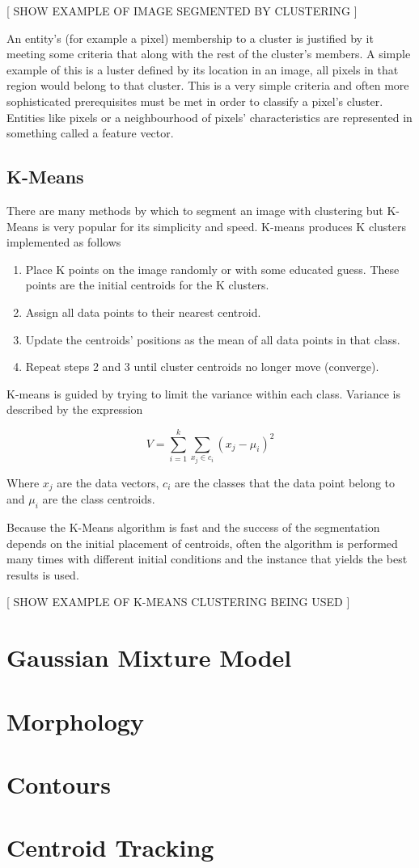 [ SHOW EXAMPLE OF IMAGE SEGMENTED BY CLUSTERING ]

An entity’s  (for example a pixel) membership to a cluster is justified by it meeting some criteria that along with the rest of the cluster’s members. A simple example of this is a luster defined by its location in an image, all pixels in that region would belong to that cluster. This is a very simple criteria and often more sophisticated prerequisites must be met in order to classify a pixel's cluster. Entities like pixels or a neighbourhood of pixels' characteristics are represented in something called a feature vector.


\subsection{K-Means}
There are many methods by which to segment an image with clustering but K-Means is very popular for its simplicity and speed. K-means produces K clusters implemented as follows

    \begin{enumerate}
    \itemsep0em
        \item Place K points on the image randomly or with some educated guess. These points are the initial centroids for the K clusters.  
        \item Assign all data points to their nearest centroid.
        \item Update the centroids' positions as the mean of all data points in that class.
        \item Repeat steps 2 and 3 until cluster centroids no longer move (converge). 
    \end{enumerate}

K-means is guided by trying to limit the variance within each class. Variance is described by the expression

\begin{equation}\label{eq:2}
   V = \sum_{i=1}^k\sum_{x_j\in c_i}(x_j-\mu_i)^2 
\end{equation}

Where {$x_j$} are the data vectors, $c_i$ are the classes that the data point belong to and $\mu_i$ are the class centroids.

Because the K-Means algorithm is fast and the success of the segmentation depends on the initial placement of centroids, often the algorithm is performed many times with different initial conditions and the instance that yields the best results is used. 


[ SHOW EXAMPLE OF K-MEANS CLUSTERING BEING USED ]
\section{Gaussian Mixture Model}


\section{Morphology}

\section{Contours}

\section{Centroid Tracking}



